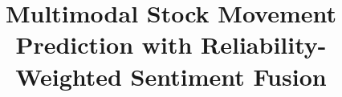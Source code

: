 \documentclass[a4paper,10pt,conference]{IEEEtran}
\begin{document}

\title{Multimodal Stock Movement Prediction with Reliability-Weighted Sentiment Fusion}

\author{}

\maketitle
\end{document}
